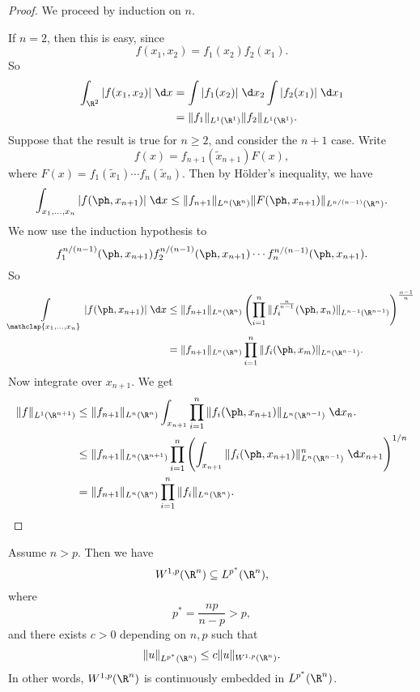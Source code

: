 \documentclass[a4paper]{article}
\begin{document}
\begin{proof}
  We proceed by induction on $n$.

  If $n = 2$, then this is easy, since
  \[
    f(x_1, x_2) = f_1(x_2) f_2(x_1).
  \]
  So
  \begin{align*}
    \int_{\R^2}|f(x_1, x_2)| \;\d x &= \int |f_1(x_2)|\;\d x_2 \int |f_2(x_1)|\;\d x_1\\
    &= \|f_1\|_{L^1(\R^1)} \|f_2\|_{L^1(\R^1)}.
  \end{align*}
  Suppose that the result is true for $n \geq 2$, and consider the $n + 1$ case. Write
  \[
    f(x) = f_{n + 1}(\tilde{x}_{n + 1}) F(x),
  \]
  where $F(x) = f_1(\tilde{x}_1) \cdots f_n(\tilde{x}_n)$. Then by H\"older's inequality, we have
  \begin{multline*}
    \int_{x_1, \ldots, x_n} |f(\ph, x_{n + 1})|\;\d x \leq \|f_{n + 1}\|_{L^n(\R^n)} \|F(\ph, x_{n + 1})\|_{L^{n/(n - 1)}(\R^n)}.
  \end{multline*}
  We now use the induction hypothesis to
  \[
    f_1^{n/(n - 1)} (\ph, x_{n + 1}) f_2^{n/(n - 1)}(\ph, x_{n + 1}) \cdots f_n^{n/(n - 1)}(\ph, x_{n + 1}).
  \]
  So
  \begin{align*}
    \int\limits_{\mathclap{x_1, \ldots, x_n}} |f(\ph, x_{n + 1})|\;\d x &\leq \|f_{n + 1}\|_{L^n(\R^n)}\left(\prod_{i = 1}^n \|f_i^{\frac{n}{n-1}} (\ph, x_n)\|_{L^{n - 1}(\R^{n - 1})}\right)^{\frac{n - 1}{n}}\\
    &= \|f_{n + 1}\|_{L^n(\R^n)} \prod_{i = 1}^n \|f_i(\ph, x_m)\|_{L^n(\R^{n - 1})}.
  \end{align*}
  Now integrate over $x_{n + 1}$. We get
  \begin{align*}
    \|f\|_{L^1(\R^{n + 1})} &\leq \|f_{n + 1}\|_{L^n(\R^n)} \int_{x_{n + 1}}\prod_{i = 1}^n \|f_i(\ph, x_{n + 1})\|_{L^n(\R^{n - 1})}\;\d x_n.\\
    &\leq \|f_{n + 1}\|_{L^n(\R^{n + 1})} \prod_{i = 1}^n \left(\int_{x_{n + 1}} \|f_i(\ph, x_{n + 1})\|^n_{L^n(\R^{n - 1})} \;\d x_{n + 1}\right)^{1/n}\\
    &= \|f_{n + 1}\|_{L^n(\R^n)} \prod_{i = 1}^n \|f_i\|_{L^n(\R^n)}.\qedhere
  \end{align*}
\end{proof}

\begin{thm}
  Assume $n > p$. Then we have
  \[
    W^{1, p}(\R^n) \subseteq L^{p^*}(\R^n),
  \]
  where
  \[
    p^* = \frac{np}{n - p} > p,
  \]
  and there exists $c > 0$ depending on $n, p$ such that
  \[
    \|u\|_{L^{p^*}(\R^n)} \leq c\|u\|_{W^{1, p}(\R^n)}.
  \]
  In other words, $W^{1, p}(\R^n)$ is continuously embedded in $L^{p^*}(\R^n)$.
\end{thm}
\end{document}
